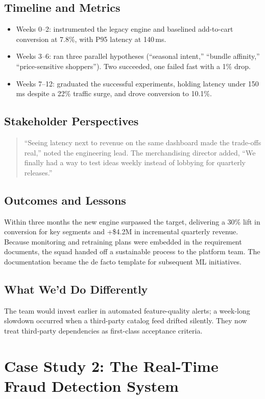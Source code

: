 \subsection{Timeline and Metrics}
\begin{itemize}
    \item Weeks 0--2: instrumented the legacy engine and baselined add-to-cart conversion at 7.8\%, with P95 latency at 140\,ms.
    \item Weeks 3--6: ran three parallel hypotheses (``seasonal intent,'' ``bundle affinity,'' ``price-sensitive shoppers''). Two succeeded, one failed fast with a 1\% drop.
    \item Weeks 7--12: graduated the successful experiments, holding latency under 150\,ms despite a 22\% traffic surge, and drove conversion to 10.1\%.
\end{itemize}

\subsection{Stakeholder Perspectives}
\begin{quote}
``Seeing latency next to revenue on the same dashboard made the trade-offs real,'' noted the engineering lead. The merchandising director added, ``We finally had a way to test ideas weekly instead of lobbying for quarterly releases.''
\end{quote}

\subsection{Outcomes and Lessons}
Within three months the new engine surpassed the target, delivering a 30\% lift in conversion for key segments and +\$4.2M in incremental quarterly revenue. Because monitoring and retraining plans were embedded in the requirement documents, the squad handed off a sustainable process to the platform team. The documentation became the de facto template for subsequent ML initiatives.

\subsection{What We'd Do Differently}
The team would invest earlier in automated feature-quality alerts; a week-long slowdown occurred when a third-party catalog feed drifted silently. They now treat third-party dependencies as first-class acceptance criteria.

\section{Case Study 2: The Real-Time Fraud Detection System}
\label{sec:case-fraud}

